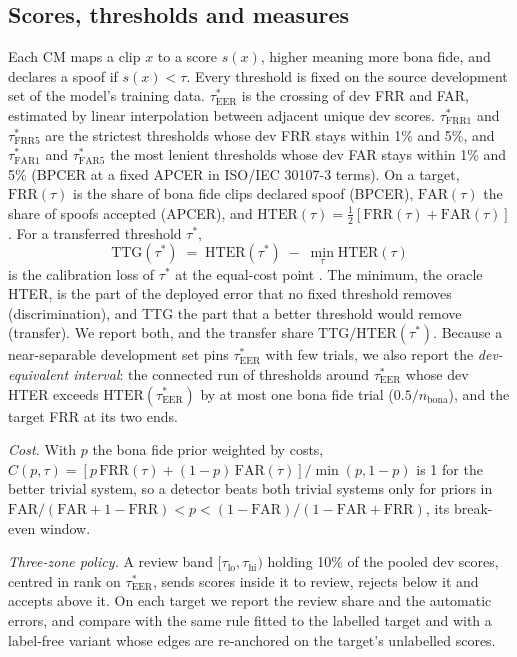 \documentclass[journal]{IEEEtran}
\newcommand{\ttg}{\mathrm{TTG}}
\newcommand{\hter}{\mathrm{HTER}}
\newcommand{\frr}{\mathrm{FRR}}
\newcommand{\far}{\mathrm{FAR}}
\newcommand{\tauE}{\tau^{*}_{\mathrm{EER}}}
\newcommand{\tauF}[1]{\tau^{*}_{\mathrm{FRR}#1}}
\newcommand{\tauA}[1]{\tau^{*}_{\mathrm{FAR}#1}}
\begin{document}
\subsection{Scores, thresholds and measures}
Each CM maps a clip \(x\) to a score \(s(x)\), higher meaning more bona fide, and declares a spoof if \(s(x)<\tau\). Every
threshold is fixed on the source development set of the model's training data. \(\tauE\) is the crossing of dev FRR and
FAR, estimated by linear interpolation between adjacent unique dev scores. \(\tauF{1}\) and \(\tauF{5}\) are the strictest
thresholds whose dev FRR stays within 1\% and 5\%, and \(\tauA{1}\) and \(\tauA{5}\) the most lenient thresholds whose dev
FAR stays within 1\% and 5\% (BPCER at a fixed APCER in ISO/IEC 30107-3 terms). On a target, \(\frr(\tau)\) is the share of
bona fide clips declared spoof (BPCER), \(\far(\tau)\) the share of spoofs accepted (APCER), and
\(\hter(\tau)=\tfrac12[\frr(\tau)+\far(\tau)]\) \cite{bengio04_hter}. For a transferred threshold \(\tau^{*}\),
\begin{equation}
\ttg(\tau^{*}) \;=\; \hter(\tau^{*}) \;-\; \min_{\tau}\hter(\tau)
\label{eq:ttg}
\end{equation}
is the calibration loss of \(\tau^{*}\) at the equal-cost point \cite{brummer06_calibration,vanleeuwen07_intro}. The
minimum, the oracle HTER, is the part of the deployed error that no fixed threshold removes (discrimination), and TTG the
part that a better threshold would remove (transfer). We report both, and the transfer share \(\ttg/\hter(\tau^{*})\).
Because a near-separable development set pins \(\tauE\) with few trials, we also report the \emph{dev-equivalent
interval}: the connected run of thresholds around \(\tauE\) whose dev HTER exceeds \(\hter(\tauE)\) by at most one bona
fide trial (\(0.5/n_{\mathrm{bona}}\)), and the target FRR at its two ends.

\emph{Cost.} With \(p\) the bona fide prior weighted by costs, \(C(p,\tau)=[p\,\frr(\tau)+(1-p)\,\far(\tau)]/\min(p,1-p)\)
is 1 for the better trivial system, so a detector beats both trivial systems only for priors in
\(\far/(\far+1-\frr)<p<(1-\far)/(1-\far+\frr)\), its break-even window.

\emph{Three-zone policy.} A review band \([\tau_{\mathrm{lo}},\tau_{\mathrm{hi}})\) holding 10\% of the pooled dev scores,
centred in rank on \(\tauE\), sends scores inside it to review, rejects below it and accepts above it. On each target we
report the review share and the automatic errors, and compare with the same rule fitted to the labelled target and with a
label-free variant whose edges are re-anchored on the target's unlabelled scores.
\end{document}

